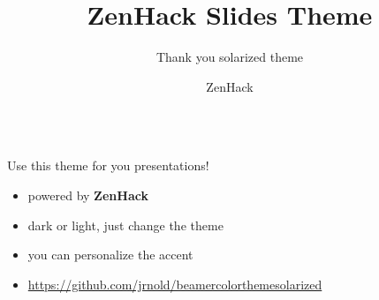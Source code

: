 \documentclass[xcolor=dvipsnames,aspectratio=169]{beamer}
\title{ZenHack Slides Theme}
\author{ZenHack}
\subtitle{Thank you solarized theme}
\begin{document}
\begin{frame}
\maketitle
\begin{columns}
	
\end{columns}
\end{frame}

\begin{frame}
\begin{theorem}
Use this theme for you presentations!
\end{theorem}

\begin{itemize}[<+->]
	\item powered by \textbf{ZenHack}
	\item dark or light, just change the theme
	\item you can personalize the accent
	\item \url{https://github.com/jrnold/beamercolorthemesolarized}
\end{itemize}
\end{frame}
\end{document}
